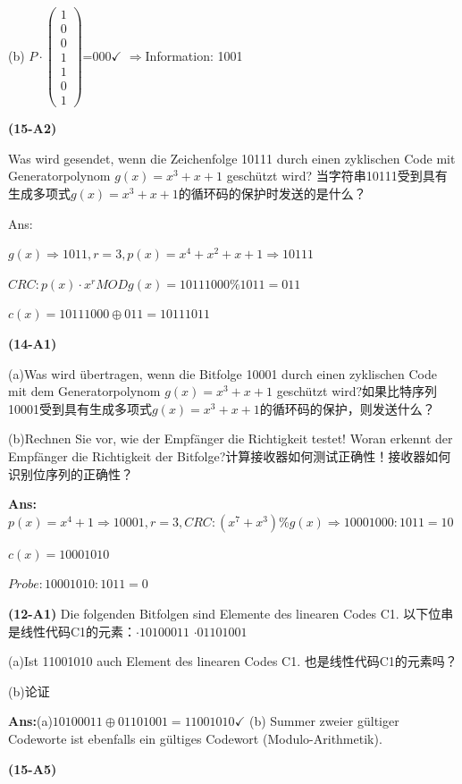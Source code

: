 \documentclass[fleqn]{article}
\begin{document}
\qquad (b) $P\cdot\begin{pmatrix}
    1\\0\\0\\1\\1\\0\\1
\end{pmatrix}$=000$\checkmark$ $\Rightarrow$Information: 1001

\noindent\textbf{(15-A2)} 

Was wird gesendet, wenn die Zeichenfolge 10111 durch einen zyklischen Code mit Generatorpolynom $g(x)=x^3+x+1$ geschützt wird? 当字符串10111受到具有生成多项式$g(x)=x^3+x+1$的循环码的保护时发送的是什么？

\quad Ans:

\qquad $g(x)\Rightarrow1011, r=3,p(x)=x^4+x^2+x+1\Rightarrow10111$

\qquad $CRC:p(x)\cdot x^r MOD g(x) = 10111000 \% 1011 = 011 $

\qquad $c(x) = 10111000\oplus 011 = 10111011$



\noindent\textbf{(14-A1)}

(a)Was wird übertragen, wenn die Bitfolge 10001 durch einen zyklischen Code mit dem Generatorpolynom $g(x) = x^3 + x + 1$ geschützt wird?如果比特序列10001受到具有生成多项式$g(x) = x^3 + x + 1$的循环码的保护，则发送什么？

(b)Rechnen Sie vor, wie der Empfänger die Richtigkeit testet! Woran erkennt der Empfänger die Richtigkeit der Bitfolge?计算接收器如何测试正确性！接收器如何识别位序列的正确性？

\textbf{Ans:}$p(x)=x^4+1\Rightarrow10001,r=3,CRC:(x^7+x^3)\%g(x)\Rightarrow10001000:1011=10$

\qquad $c(x)=10001010$

\qquad $Probe:10001010:1011=0$

\noindent\textbf{(12-A1)} Die folgenden Bitfolgen sind Elemente des linearen Codes C1. 以下位串是线性代码C1的元素：$\cdot10100011 $ \qquad $\cdot 01101001$

(a)Ist 11001010 auch Element des linearen Codes C1. 也是线性代码C1的元素吗？

(b)论证

\textbf{Ans:}(a)$10100011 \oplus01101001 = 11001010\checkmark$ (b) Summer zweier gültiger Codeworte ist ebenfalls ein gültiges Codewort (Modulo-Arithmetik).

\noindent\textbf{(15-A5)} 
\end{document}
